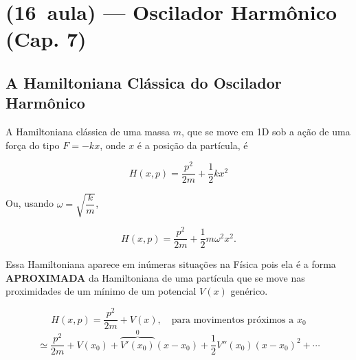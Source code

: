\section*{(16\textordfeminine\ aula) --- Oscilador Harmônico (Cap. 7)}

\subsection*{A Hamiltoniana Clássica do Oscilador Harmônico}

A Hamiltoniana clássica de uma massa $m$, que se move em 1D sob a ação de uma força do tipo $F = -kx$, onde $x$ é a posição da partícula, é

\begin{equation}
    H(x,p) = \frac{p^2}{2m} + \frac{1}{2}kx^2
\label{eq:aula16_H_xp_k}
\end{equation}

Ou, usando $\omega = \sqrt{\dfrac{k}{m}}$,

\begin{equation}
    H(x,p) = \frac{p^2}{2m} + \frac{1}{2}m\omega^2 x^2 .
\label{eq:aula16_H_xp_omega}
\end{equation}

Essa Hamiltoniana aparece em inúmeras situações na Física pois ela é a forma \textbf{APROXIMADA} da Hamiltoniana de uma partícula que se move nas proximidades de um mínimo de um potencial $V(x)$ genérico.

\begin{center}
\end{center}

\begin{equation}
    H(x,p) = \frac{p^2}{2m} + V(x), \quad \text{para movimentos próximos a } x_0
\label{eq:aula16_H_proximo_x0}
\end{equation}
\begin{equation}
    \simeq \frac{p^2}{2m} + V(x_0) + \overbrace{V'(x_0)}^{0}(x-x_0) + \frac{1}{2}V''(x_0)(x-x_0)^2 + \cdots
\label{eq:aula16_V_expansao}
\end{equation}

